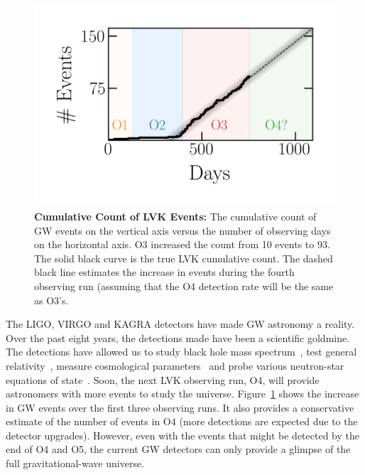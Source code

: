 \begin{figure}
\begin{center}
\centerline{\includegraphics[width=1.\linewidth]{src/figures/gw_detection_timeframe.png}}
  \caption{\textbf{Cumulative Count of LVK Events:} The cumulative count of GW events on the vertical axis versus the number of observing days on the horizontal axis. O3 increased the count from 10 events to 93. The solid black curve is the true LVK cumulative count. The dashed black line estimates the increase in events during the fourth observing run (assuming that the O4 detection rate will be the same as O3's.  }
  \label{fig:accumulation_of_gw_events}
\end{center}
\end{figure}

The LIGO, VIRGO and KAGRA detectors have made GW astronomy a reality. 
Over the past eight years, the detections made have been a scientific goldmine. 
The detections have allowed us to study black hole mass spectrum~\cite{}, test general relativity~\cite{}, measure cosmological parameters~\cite{} and probe various neutron-star equations of state~\cite{}. 
Soon, the next LVK observing run, O4, will provide astronomers with more events to study the universe. 
Figure~\ref{fig:accumulation_of_gw_events} shows the increase in GW events over the first three observing runs. 
It also provides a conservative estimate of the number of events in O4 (more detections are expected due to the detector upgrades).
However, even with the events that might be detected by the end of O4 and O5, the current GW detectors can only provide a glimpse of the full gravitational-wave universe. 

